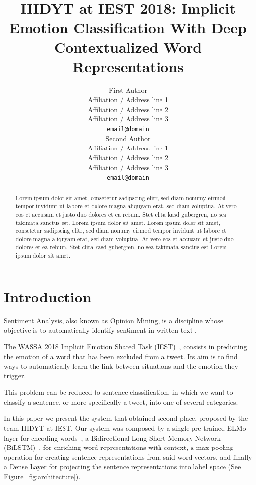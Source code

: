 \documentclass[11pt,a4paper]{article}
\title{IIIDYT at IEST 2018: Implicit Emotion Classification With Deep
Contextualized Word Representations}
\author{First Author \\
  Affiliation / Address line 1 \\
  Affiliation / Address line 2 \\
  Affiliation / Address line 3 \\
  {\tt email@domain} \\
  \And{}
  Second Author \\
  Affiliation / Address line 1 \\
  Affiliation / Address line 2 \\
  Affiliation / Address line 3 \\
  {\tt email@domain} \\}
\date{}
\newcommand{\Acronym}[1]{\mbox{#1}}
\begin{document}
\maketitle
\begin{abstract}

Lorem ipsum dolor sit amet, consetetur sadipscing elitr, sed diam nonumy eirmod
tempor invidunt ut labore et dolore magna aliquyam erat, sed diam voluptua. At
vero eos et accusam et justo duo dolores et ea rebum. Stet clita kasd gubergren,
no sea takimata sanctus est. Lorem ipsum dolor sit amet. Lorem ipsum dolor sit
amet, consetetur sadipscing elitr, sed diam nonumy eirmod tempor invidunt ut
labore et dolore magna aliquyam erat, sed diam voluptua. At vero eos et accusam
et justo duo dolores et ea rebum. Stet clita kasd gubergren, no sea takimata
sanctus est Lorem ipsum dolor sit amet.

\end{abstract}

\section{Introduction}

Sentiment Analysis, also known as Opinion Mining, is a discipline whose
objective is to automatically identify sentiment in written text
\cite{balazs2016opinion}.

The \Acronym{WASSA} 2018 Implicit Emotion Shared Task
(\Acronym{IEST})~\cite{klinger2018iest}, consists in predicting the emotion of a
word that has been excluded from a tweet. Its aim is to find ways to
automatically learn the link between situations and the emotion they trigger.

This problem can be reduced to sentence classification, in which we
want to classify a sentence, or more specifically a tweet, into one of several
categories.

In this paper we present the system that obtained second place, proposed by the
team \Acronym{IIIDYT} at \Acronym{IEST}\@. Our system was composed by a single
pre-trained \Acronym{ELMo} layer for encoding words~\cite{peters2018deep}, a
Bidirectional Long-Short Memory Network
(\Acronym{BiLSTM})~\cite{graves2005framewise, graves2013speech}, for enriching
word representations with context, a max-pooling operation for creating sentence
representations from said word vectors, and finally a Dense Layer for projecting
the sentence representations into label space (See
Figure~\ref{fig:architecture}).
\end{document}
